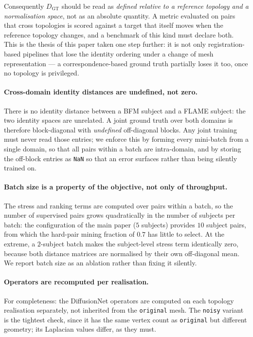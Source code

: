 \documentclass{article}
\begin{document}
Consequently $D_{\mathrm{GT}}$ should be read as \emph{defined relative to a reference
topology and a normalisation space}, not as an absolute quantity. A metric evaluated on
pairs that cross topologies is scored against a target that itself moves when the reference
topology changes, and a benchmark of this kind must declare both. This is the thesis of this
paper taken one step further: it is not only registration-based pipelines that lose the
identity ordering under a change of mesh representation --- a correspondence-based ground
truth partially loses it too, once no topology is privileged.

\paragraph{Cross-domain identity distances are undefined, not zero.}
There is no identity distance between a BFM subject and a FLAME subject: the two
identity spaces are unrelated. A joint ground truth over both domains is therefore
block-diagonal with \emph{undefined} off-diagonal blocks. Any joint training must never
read those entries; we enforce this by forming every mini-batch from a single domain, so
that all pairs within a batch are intra-domain, and by storing the off-block entries as
\texttt{NaN} so that an error surfaces rather than being silently trained on.

\paragraph{Batch size is a property of the objective, not only of throughput.}
The stress and ranking terms are computed over pairs within a batch, so the number of
supervised pairs grows quadratically in the number of subjects per batch: the
configuration of the main paper ($5$ subjects) provides $10$ subject pairs, from which
the hard-pair mining fraction of $0.7$ has little to select. At the extreme, a
$2$-subject batch makes the subject-level stress term identically zero, because both
distance matrices are normalised by their own off-diagonal mean. We report batch size as
an ablation rather than fixing it silently.

\paragraph{Operators are recomputed per realisation.}
For completeness: the DiffusionNet operators are computed on each topology realisation
separately, not inherited from the \texttt{original} mesh. The \texttt{noisy} variant is
the tightest check, since it has the same vertex count as \texttt{original} but different
geometry; its Laplacian values differ, as they must.

{\small


}
\end{document}
